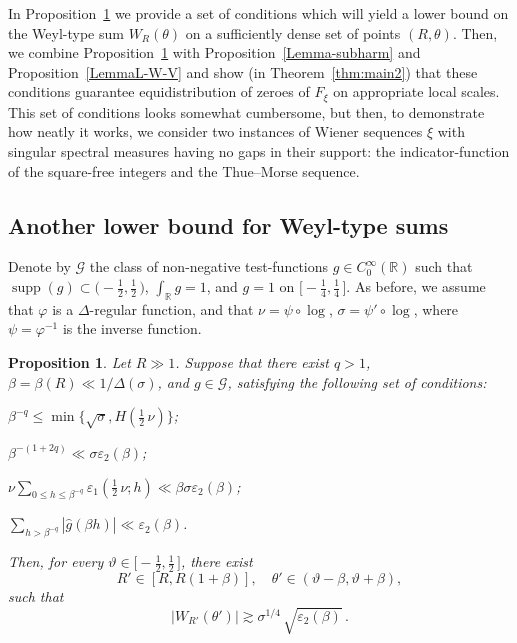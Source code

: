 \documentclass[11pt]{amsart}
\numberwithin{equation}{section}
\newtheorem{proposition}{Proposition}
\def\ep{{\varepsilon}}
\newcommand{\bR}{\mathbb R}
\begin{document}
In Proposition~\ref{Lemma5a} we provide a set of conditions which will yield a lower
bound on the Weyl-type sum $W_R(\theta)$ on a sufficiently dense set of points
$(R, \theta)$. Then, we combine Proposition~\ref{Lemma5a} with Proposition~\ref{Lemma-subharm} and Proposition~\ref{LemmaL-W-V} and show (in Theorem~\ref{thm:main2}) that these
conditions guarantee equidistribution of zeroes of $F_\xi$ on appropriate local scales.
This set of conditions looks somewhat cumbersome, but then, to demonstrate how neatly it works,
we consider two instances of Wiener sequences $\xi$  with singular spectral measures
having no gaps in their support: the indicator-function of the square-free integers
and the Thue--Morse sequence.

\subsection{Another lower bound for Weyl-type sums}
\label{subsec:LB-general}

Denote by $\mathcal G$ the class of non-negative test-functions $g\in C_0^\infty (\bR)$ such that
$\operatorname{supp}(g)\subset \bigl(-\tfrac12, \tfrac12\, \bigr)$, $\displaystyle \int_\bR g = 1$, and
$g=1$ on $\bigl[-\tfrac14, \tfrac14\, \bigr]$.
As before, we assume that $\varphi$ is a $\Delta$-regular function, and
that $\nu = \psi\circ\log$, $\sigma=\psi'\circ\log$, where $\psi=\varphi^{-1}$ is the inverse
function.

\begin{proposition}\label{Lemma5a}
Let $R\gg 1$. Suppose that there exist $q>1$, $\beta=\beta(R)\ll 1/\Delta(\sigma)$,
and $g\in \mathcal G$, satisfying the following set of conditions:

\smallskip{}
$\beta^{-q} \le \min\bigl\{\sqrt{\sigma}, H(\tfrac12\, \nu)\bigr\}$;

\medskip{}
$\beta^{-(1+2q)} \ll \sigma\ep_2(\beta)$;

\medskip{}
$\displaystyle \nu \sum_{0\le h \le \beta^{-q}} \ep_1(\tfrac12\, \nu; h) \ll \beta\sigma\ep_2(\beta) $;

\medskip{}
$\displaystyle \sum_{h>\beta^{-q}} |\widehat{g}(\beta h)| \ll \ep_2(\beta) $.

\smallskip
Then, for every $\vartheta\in \bigl[-\tfrac12,  \tfrac12\, \bigr]$, there exist
\[
R'\in [R, R(1+\beta)],  \quad \theta'\in (\vartheta-\beta, \vartheta+\beta),
\]
such that
\[
|W_{R'}(\theta')| \gtrsim \sigma^{1/4}\, \sqrt{\ep_2 (\beta)}\,.
\]
\end{proposition}
\end{document}
